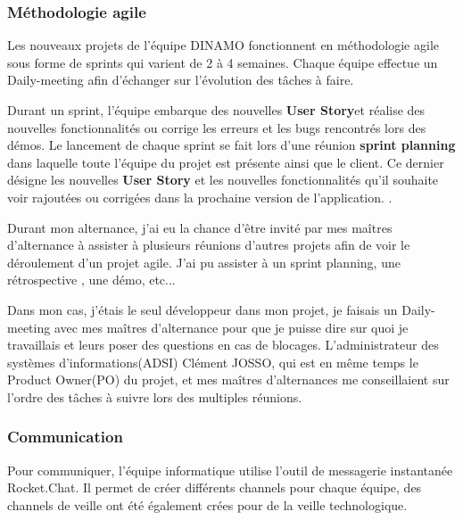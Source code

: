 \documentclass[12pt]{article}
\begin{document}
\subsubsection{Méthodologie agile}

Les nouveaux projets de l'équipe DINAMO fonctionnent en méthodologie agile sous forme de sprints qui varient de 2 à 4 semaines. Chaque équipe effectue un Daily-meeting afin d'échanger sur l'évolution des tâches à faire.

Durant un sprint, l'équipe embarque des nouvelles \textbf{User Story}\footnotemark et réalise des nouvelles fonctionnalités ou corrige les erreurs et les bugs rencontrés lors des démos. Le lancement de chaque sprint se fait lors d'une réunion \textbf{sprint planning} dans laquelle toute l'équipe du projet est présente ainsi que le client. Ce dernier désigne les nouvelles \textbf{User Story} et les nouvelles fonctionnalités qu'il souhaite voir rajoutées ou corrigées dans la prochaine version de l'application. 
.

Durant mon alternance, j'ai eu la chance d'être invité par mes maîtres d'alternance à assister à plusieurs réunions d'autres projets afin de voir le déroulement d'un projet agile. J'ai pu assister à un sprint planning, une rétrospective , une démo, etc...    

Dans mon cas, j'étais le seul développeur dans mon projet, je faisais un Daily-meeting avec mes maîtres d'alternance pour que je puisse dire sur quoi je travaillais et leurs poser des questions en cas de blocages. L'administrateur des systèmes d'informations(ADSI) Clément JOSSO, qui est en même temps le Product Owner(PO) du projet, et mes maîtres d'alternances me conseillaient sur l'ordre des tâches à suivre lors des multiples réunions.   

\subsubsection{Communication}

Pour communiquer, l'équipe informatique utilise l'outil de messagerie instantanée Rocket.Chat. Il permet de créer différents
channels pour chaque équipe, des channels de veille ont été également crées pour de la veille technologique.
\end{document}
